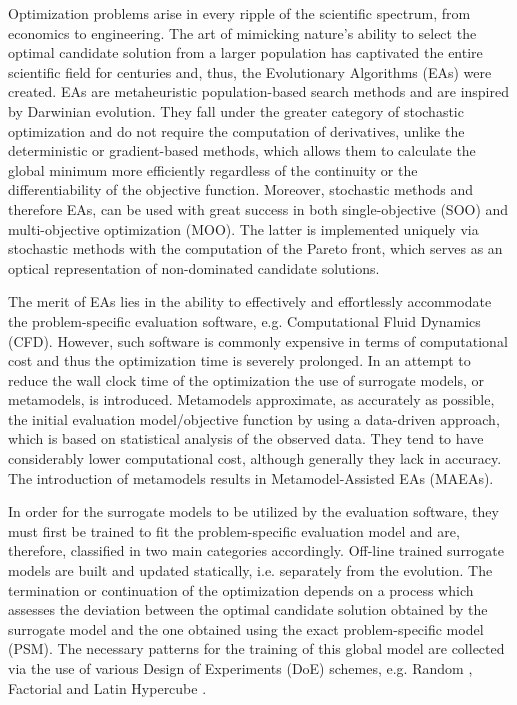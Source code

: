 
Optimization problems arise in every ripple of the 
scientific spectrum, from economics to engineering. The 
art of mimicking nature's ability to select the optimal 
candidate solution from a larger population has 
captivated the entire scientific field for centuries and, 
thus, the Evolutionary Algorithms (EAs) were created. EAs 
are metaheuristic population-based search methods and 
are inspired by Darwinian evolution. They fall 
under the greater category of stochastic optimization 
and do not require the computation of derivatives, unlike 
the deterministic or gradient-based methods, which allows 
them to calculate the global minimum more efficiently 
regardless of the continuity or the differentiability 
of the objective function. Moreover, stochastic methods 
and therefore EAs, can be used with great success in both 
single-objective (SOO) and multi-objective optimization 
(MOO). The latter is implemented uniquely via stochastic 
methods with the computation of the Pareto front, which  
serves as an optical representation of non-dominated 
candidate solutions.    

The merit of EAs lies in the ability to effectively and 
effortlessly accommodate the problem-specific evaluation 
software, e.g. Computational Fluid Dynamics (CFD). 
However, such software is commonly expensive in terms of 
computational cost and thus the optimization time is severely 
prolonged. In an attempt to reduce the wall clock time of the 
optimization the use of surrogate models, or metamodels, is 
introduced. Metamodels approximate, as accurately as possible, 
the initial evaluation model/objective function by using a 
data-driven approach, which is based on statistical analysis 
of the observed data. They tend to have considerably lower 
computational cost, although generally they lack in accuracy. 
The introduction of metamodels results in Metamodel-Assisted EAs 
(MAEAs)\cite{MAEA}. 

In order for the surrogate models to be utilized by  
the evaluation software, they must first be trained to 
fit the problem-specific evaluation model and are, therefore, 
classified in two main categories accordingly. Off-line trained 
surrogate models are built and updated statically, i.e. 
separately from the evolution. The termination or continuation 
of the optimization depends on a process which assesses the 
deviation between the optimal candidate solution obtained by 
the surrogate model and the one obtained using the exact 
problem-specific model (PSM). The necessary patterns for the 
training of this global model are collected via the use of various 
Design of Experiments (DoE)\cite{DOE} schemes, e.g. Random 
\cite{Random}, Factorial \cite{Factorial, Fractional Factorial, 
Full_Factorial2} and Latin Hypercube \cite{Latin Hypercube,LHS}. 

